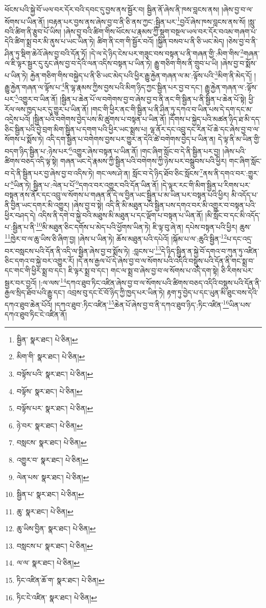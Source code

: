 ཕོངས་པའི་སྐྱེ་བོ་ཡལ་བར་དོར་བའི་དབང་དུ་བྱས་ནས་སྦྱོར་བ། སྦྱིན་ནོ་ཞེས་ནི་ཁས་བླངས་ནས། །ཞེས་བྱ་བ་ལ་སོགས་པ་ཡིན་ནོ། །བརྟན་པར་བྱས་ནས་ཞེས་བྱ་བ་ནི་ཅི་ནས་ཀྱང་:སྦྱིན་པར་\footnote{སྦྱིན་  སྣར་ཐང་།  པེ་ཅིན། }བྱའོ་ཞེས་ཁས་བླངས་ནས་སོ། །སླུ་བའི་ཚིག་ནི་རྩུབ་པོ་ཡིས། །ཞེས་བྱ་བའི་ཚིག་གིས་ཕོངས་པ་རྣམས་ཀྱི་སྡུག་བསྔལ་ཡལ་བར་དོར་བའམ་གཞག་པ་དེའི་ཚིག་སྨྲ་བར་མི་ནུས་པ་ཡང་ཡིན་ཏེ། ཚིག་ནི་ངག་གི་སྦྱོར་བའོ། །སྐྱིན་བསབ་པ་ནི་ཅི་ཡང་མེད། །ཅེས་བྱ་བ་ནི་ཤིན་ཏུ་སྡིག་ཆེའོ་ཞེས་བྱ་བའི་དོན་ཏོ། །དེ་ལ་དེ་ཉིད་ངེས་པར་གཟུང་བས་བསྟན་པ་ནི་གཞན་གྱི་:མིག་གིས་\footnote{མིག་གི་  སྣར་ཐང་།  པེ་ཅིན། }གཞན་ལ་ཇི་ལྟར་སྦྱར་དུ་རུང་ཞེས་བྱ་བ་དེའི་ལན་འདིས་བསྟན་པ་ཡིན་ཏེ། རྒྱུ་གཅིག་གིས་ནི་གྲུབ་པ་ཡི། །ཞེས་བྱ་བ་སྨོས་པ་ཡིན་ཏེ། རྐྱེན་གཅིག་གིས་བསྐྱེད་པ་ནི་ཅི་ཡང་མེད་པའི་ཕྱིར་རྒྱུ་རྐྱེན་གཞན་ལ་མ་:ལྟོས་པའི་\footnote{བལྟོས་པའི་  སྣར་ཐང་།  པེ་ཅིན། }མིག་ནི་མེད་དོ། །རྒྱུ་རྐྱེན་གཞན་ལ་ལྟོས་པ་\footnote{བལྟོས་  སྣར་ཐང་།  པེ་ཅིན། }ནི་ལྷ་རྣམས་ཀྱིས་བྱས་པའི་མིག་ཉིད་ཀྱང་སྦྱིན་པར་བྱ་བ་དང་། རྒྱུ་རྐྱེན་གཞན་ལ་:ལྟོས་པར་\footnote{བལྟོས་པར་  སྣར་ཐང་།  པེ་ཅིན། }འགྱུར་བ་ཡིན་ནོ། །སྦྱིན་པ་ཆེན་པོ་ལ་བགེགས་བྱ་བ་ཞེས་བྱ་བ་ནི་ནང་གི་སྦྱིན་པ་ནི་སྦྱིན་པ་ཆེན་པོ་སྟེ། ཕྱི་རོལ་ལས་ཁྱད་པར་དུ་གྱུར་པ་ཡིན་ནོ། །གང་གི་ཕྱིར་ནང་གི་སྦྱིན་པ་ནི་ཤིན་ཏུ་དཀའ་བ་ཡིན་པས་དེ་དག་དང་མ་འདྲེས་པའོ། །སྦྱིན་པའི་བགེགས་བྱེད་པས་མི་ཚུགས་པ་བསྟན་པ་ཡིན་ནོ། །དོགས་པ་སྐྱེད་པའི་མཚན་ཉིད་ཐ་མི་དད་ཅིང་སྦྱིན་པའི་བྱེ་བྲག་མིག་སྦྱིན་པ་དགག་པའི་ཕྱིར་ཡང་སྨྲས་པ། ལྷ་ནོར་དང་འབྲུ་དང་རིན་པོ་ཆེ་དང་ཞེས་བྱ་བ་ལ་སོགས་པ་སྨོས་ཏེ། འདི་དག་སྦྱིན་པ་བགེགས་བྱས་པར་གྱུར་ན་དེའི་ཚེ་བགེགས་བྱེད་པ་ཡིན་ན། དེ་ལྟ་ནི་མ་ཡིན་གྱི་བདག་ཉིད་སྦྱིན་པ་:ཉེས་པར་\footnote{ཉེ་བར་  སྣར་ཐང་།  པེ་ཅིན། }འགྱུར་ཞེས་བསྟན་པ་ཡིན་ནོ། །གང་ཞིག་སློང་བ་དེ་ནི་སྦྱིན་པར་བྱ། །ཞེས་པའི་ཚིགས་བཅད་འདི་ལྟ་སྟེ། གཞན་ཡང་དེ་རྣམས་ཀྱི་སྦྱིན་པའི་བགེགས་ཀྱི་ཉེས་པར་བསྒྲུབས་པའི་ཕྱིར། གང་ཞིག་སློང་བ་དེ་ནི་སྦྱིན་པར་བྱ་ཞེས་བྱ་བ་འདིས་ཏེ། གང་ལས་ཤེ་ན། སློང་བ་དེ་ཉིད་ཐོབ་ཅིང་སློངས་\footnote{བསླངས་  སྣར་ཐང་།  པེ་ཅིན། }ནས་ནི་དགའ་བར་:གྱུར་པ་\footnote{འགྱུར་བ་  སྣར་ཐང་།  པེ་ཅིན། }ཡིན་ཏེ། སྦྱིན་པ་:ལེན་པ་པོ་\footnote{ལེན་པས་  སྣར་ཐང་།  པེ་ཅིན། }དགའ་བར་འགྱུར་བའི་དོན་ཡིན་ནོ། །དེ་ལྟར་རང་གི་མིག་སྦྱིན་པ་རིགས་པར་བསྟན་ནས་ནོར་དང་འབྲུ་ལ་སོགས་པ་གཞན་ནི་དེ་ལ་བྱིན་ཡང་སྦྱིན་པ་མ་ཡིན་པར་བསྟན་པའི་ཕྱིར། མི་འདོད་པ་ནི་བྱིན་ཡང་དགར་མི་འགྱུར། །ཞེས་བྱ་བ་སྟེ། འདི་ནི་མི་མཐུན་པའི་སྦྱིན་པས་དགའ་བར་མི་འགྱུར་བ་བསྟན་པའི་ཕྱིར་བཤད་དེ། འདིས་ནི་དགེ་བ་སྐྱེ་བའི་མཐུས་མི་མཐུན་པ་དང་ལྡོག་པ་བསྟན་པ་ཡིན་ནོ། །མི་སློང་བ་དང་མི་འདོད་པ་:སྦྱིན་པ་ནི་\footnote{སྦྱིན་པ་  སྣར་ཐང་།  པེ་ཅིན། }མི་མཐུན་ཅིང་དགོས་པ་མེད་པའི་ཕྱོགས་ཡིན་ཏེ། ཇི་ལྟ་བུ་ཞེ་ན། དཔེས་བསྟན་པའི་ཕྱིར། ཆུས་\footnote{ཆུ་  སྣར་ཐང་།  པེ་ཅིན། }ཁྱེར་བ་ལ་ཆུ་ཡིས་ཅི་ཞིག་བྱ། །ཞེས་པ་ཡིན་ཏེ། ཆོས་མཐུན་པའི་དཔེའོ། །སྐོམ་པ་ལ་:ཆུའི་སྦྱིན་\footnote{ཆུ་ཡིས་བྱིན་  སྣར་ཐང་།  པེ་ཅིན། }པ་དང་འདྲ་བར་བསླངས་པའི་དོན་ནི་འདི་ལ་སྦྱིན་ཞེས་བྱ་བ་སྨོས་ཏེ། :བླངས་པ་\footnote{བསླངས་པ་  སྣར་ཐང་།  པེ་ཅིན། }དེ་ཉིད་སྦྱིན་ན་སྐྱེ་བོ་དགའ་བ་ཀུན་ཏུ་འཛིན་ཅིང་དགའ་བ་སྐྱེ་བར་འགྱུར་རོ། །དེ་ནས་རྒྱལ་པོ་དེ་ཞེས་བྱ་བ་ལ་སོགས་པའི་འདིའི་བསྡུས་པའི་དོན་ནི་གང་སྨྲ་བ་དང་གང་གི་ཕྱིར་སྨྲ་བ་དང་། ཇི་ལྟར་སྨྲ་བ་དང་། གང་ལ་སྨྲ་བ་ཞེས་བྱ་བ་ལ་སོགས་པ་འདི་དག་སྟེ། ཅི་རིགས་པར་སྦྱར་བར་བྱའོ། །:ལ་ལས་\footnote{ལ་ལ་  སྣར་ཐང་།  པེ་ཅིན། }དཀའ་ཐུབ་ཏིང་འཛིན་ཞེས་བྱ་བ་ལ་སོགས་པའི་ཚིགས་བཅད་འདིའི་བསྡུས་པའི་དོན་ནི་རྒྱལ་སྲིད་ཐོབ་པའི་རྒྱུ་དང་། འབྲས་བུ་དང་ངོ་བོ་ཉིད་ཀྱི་ཁྱད་པར་ཡིན་ཏེ། རྟག་ཏུ་བྱེད་པ་དང་ཡུན་མི་ཐུང་བས་དེའི་དཀའ་ཐུབ་ཆེན་པོའོ། །དཀའ་ཐུབ་:ཏིང་འཛིན་\footnote{ཏིང་འཛིན་ཆོ་ག་  སྣར་ཐང་།  པེ་ཅིན། }ཆེན་པོ་ཞེས་བྱ་བ་ནི་དཀའ་ཐུབ་ཉིད་:ཏིང་འཛིན་\footnote{ཏིང་ངེ་འཛིན་  སྣར་ཐང་།  པེ་ཅིན། }ཡིན་པས་དཀའ་ཐུབ་ཏིང་ངེ་འཛིན་ནོ། 